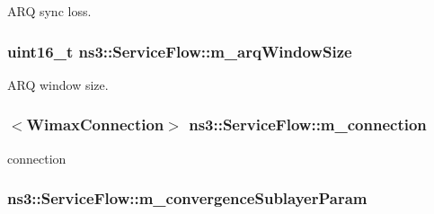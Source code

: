 A\+RQ sync loss. 

\subsubsection[{\texorpdfstring{m\+\_\+arq\+Window\+Size}{m_arqWindowSize}}]{\setlength{\rightskip}{0pt plus 5cm}uint16\+\_\+t ns3\+::\+Service\+Flow\+::m\+\_\+arq\+Window\+Size\hspace{0.3cm}{\ttfamily [private]}}\hypertarget{classns3_1_1ServiceFlow_ab160ff007191a43ea79a77d7da31d1cf}{}\label{classns3_1_1ServiceFlow_ab160ff007191a43ea79a77d7da31d1cf}


A\+RQ window size. 

\subsubsection[{\texorpdfstring{m\+\_\+connection}{m_connection}}]{$<${\bf Wimax\+Connection}$>$ ns3\+::\+Service\+Flow\+::m\+\_\+connection\hspace{0.3cm}{\ttfamily [private]}}\hypertarget{classns3_1_1ServiceFlow_a5655fd21757cc55c16943c453bad928d}{}\label{classns3_1_1ServiceFlow_a5655fd21757cc55c16943c453bad928d}


connection 

\subsubsection[{\texorpdfstring{m\+\_\+convergence\+Sublayer\+Param}{m_convergenceSublayerParam}}]{ ns3\+::\+Service\+Flow\+::m\+\_\+convergence\+Sublayer\+Param\hspace{0.3cm}{\ttfamily [private]}}\hypertarget{classns3_1_1ServiceFlow_a4add395bf3ab6259353e62227a88d04c}{}\label{classns3_1_1ServiceFlow_a4add395bf3ab6259353e62227a88d04c}


